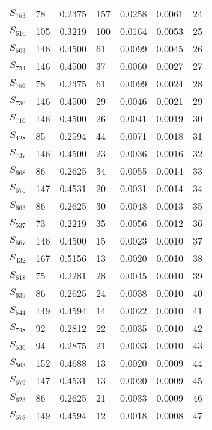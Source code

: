\begin{xltabular}{\textwidth}{XXXXXXX}
  $S_{753}$ & 78 & 0.2375 & 157 & 0.0258 & 0.0061 & 24 \\ 
  $S_{616}$ & 105 & 0.3219 & 100 & 0.0164 & 0.0053 & 25 \\ 
  $S_{503}$ & 146 & 0.4500 & 61 & 0.0099 & 0.0045 & 26 \\ 
  $S_{754}$ & 146 & 0.4500 & 37 & 0.0060 & 0.0027 & 27 \\ 
  $S_{756}$ & 78 & 0.2375 & 61 & 0.0099 & 0.0024 & 28 \\ 
  $S_{736}$ & 146 & 0.4500 & 29 & 0.0046 & 0.0021 & 29 \\ 
  $S_{716}$ & 146 & 0.4500 & 26 & 0.0041 & 0.0019 & 30 \\ 
  $S_{428}$ & 85 & 0.2594 & 44 & 0.0071 & 0.0018 & 31 \\ 
  $S_{737}$ & 146 & 0.4500 & 23 & 0.0036 & 0.0016 & 32 \\ 
  $S_{668}$ & 86 & 0.2625 & 34 & 0.0055 & 0.0014 & 33 \\ 
  $S_{675}$ & 147 & 0.4531 & 20 & 0.0031 & 0.0014 & 34 \\ 
  $S_{663}$ & 86 & 0.2625 & 30 & 0.0048 & 0.0013 & 35 \\ 
  $S_{537}$ & 73 & 0.2219 & 35 & 0.0056 & 0.0012 & 36 \\ 
  $S_{667}$ & 146 & 0.4500 & 15 & 0.0023 & 0.0010 & 37 \\ 
  $S_{432}$ & 167 & 0.5156 & 13 & 0.0020 & 0.0010 & 38 \\ 
  $S_{618}$ & 75 & 0.2281 & 28 & 0.0045 & 0.0010 & 39 \\ 
  $S_{639}$ & 86 & 0.2625 & 24 & 0.0038 & 0.0010 & 40 \\ 
  $S_{544}$ & 149 & 0.4594 & 14 & 0.0022 & 0.0010 & 41 \\ 
  $S_{748}$ & 92 & 0.2812 & 22 & 0.0035 & 0.0010 & 42 \\ 
  $S_{536}$ & 94 & 0.2875 & 21 & 0.0033 & 0.0010 & 43 \\ 
  $S_{563}$ & 152 & 0.4688 & 13 & 0.0020 & 0.0009 & 44 \\ 
  $S_{679}$ & 147 & 0.4531 & 13 & 0.0020 & 0.0009 & 45 \\ 
  $S_{623}$ & 86 & 0.2625 & 21 & 0.0033 & 0.0009 & 46 \\ 
  $S_{578}$ & 149 & 0.4594 & 12 & 0.0018 & 0.0008 & 47 \\ 

\end{xltabular}
